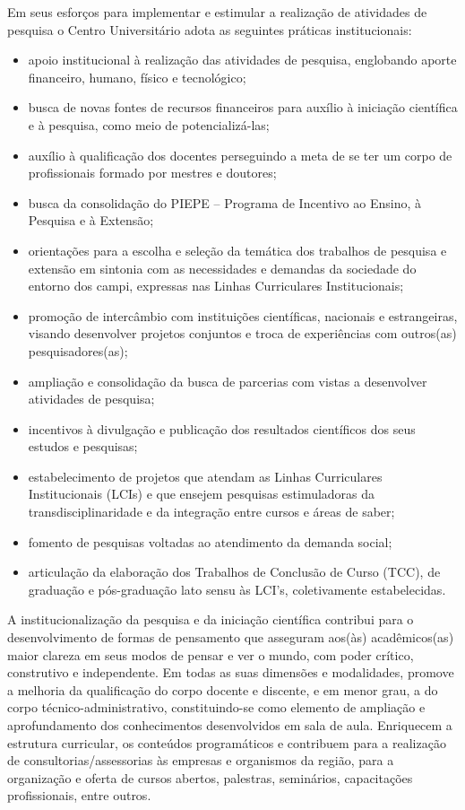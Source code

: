 \documentclass[a4paper, 12pt, openright, oneside, german, french, english, brazil]{abntex2}
\begin{document}
Em seus esforços para implementar e estimular a realização de atividades de pesquisa o Centro Universitário adota as seguintes práticas institucionais:

\begin{itemize}
\item apoio institucional à realização das atividades de pesquisa, englobando aporte financeiro, humano, físico e tecnológico;
\item busca de novas fontes de recursos financeiros para auxílio à iniciação científica e à pesquisa, como meio de potencializá-las;
\item auxílio à qualificação dos docentes perseguindo a meta de se ter um corpo de profissionais formado por mestres e doutores;
\item busca da consolidação do PIEPE – Programa de Incentivo ao Ensino, à Pesquisa e à Extensão;
\item orientações para a escolha e seleção da temática dos trabalhos de pesquisa e extensão em sintonia com as necessidades e demandas da sociedade do entorno dos campi, expressas nas Linhas Curriculares Institucionais;
\item promoção de intercâmbio com instituições científicas, nacionais e estrangeiras, visando desenvolver projetos conjuntos e troca de experiências com outros(as) pesquisadores(as);
\item ampliação e consolidação da busca de parcerias com vistas a desenvolver atividades de pesquisa;
\item incentivos à divulgação e publicação dos resultados científicos dos seus estudos e pesquisas;
\item estabelecimento de projetos que atendam as Linhas Curriculares Institucionais (LCIs) e que ensejem pesquisas estimuladoras da transdisciplinaridade e da integração entre cursos e áreas de saber;
\item fomento de pesquisas voltadas ao atendimento da demanda social;
\item articulação da elaboração dos Trabalhos de Conclusão de Curso (TCC), de graduação e pós-graduação lato sensu às LCI’s, coletivamente estabelecidas.
\end{itemize}

A institucionalização da pesquisa e da iniciação científica contribui para o desenvolvimento de formas de pensamento que asseguram aos(às) acadêmicos(as) maior clareza em seus modos de pensar e ver o mundo, com poder crítico, construtivo e independente. Em todas as suas dimensões e modalidades, promove a melhoria da qualificação do corpo docente e discente, e em menor grau, a do corpo técnico-administrativo, constituindo-se como elemento de ampliação e aprofundamento dos conhecimentos desenvolvidos em sala de aula. Enriquecem a estrutura curricular, os conteúdos programáticos e contribuem para a realização de consultorias/assessorias às empresas e organismos da região, para a organização e oferta de cursos abertos, palestras, seminários, capacitações profissionais, entre outros.
\end{document}
